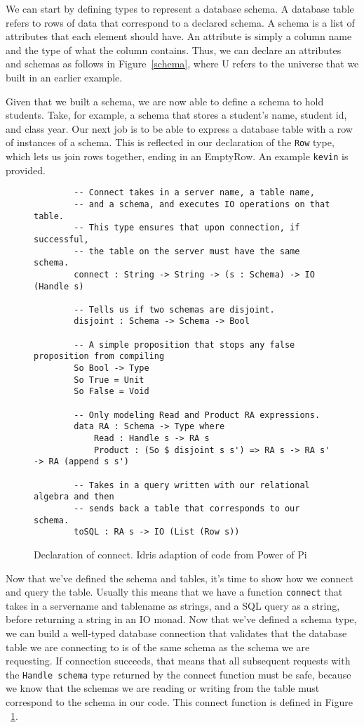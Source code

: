 We can start by defining types to represent a database schema. A database table
refers to rows of data that correspond to a declared schema. A schema is a list
of attributes that each element should have. An attribute is simply a column
name and the type of what the column contains. Thus, we can declare an
attributes and schemas as follows in Figure~\ref{schema}, where U refers to the
universe that we built in an earlier example. 

Given that we built a schema, we are now able to define a schema to hold
students. Take, for example, a schema that stores a student's name, student id,
and class year. Our next job is to be able to express a database table with a
row of instances of a schema. This is reflected in our declaration of the
\texttt{Row} type, which lets us join rows together, ending in an EmptyRow. An
example \texttt{kevin} is provided. 

\begin{figure}[ht!]
    \caption{Declaration of connect. Idris adaption of code from Power of Pi
    \protect\cite{power_of_pi}}
    \label{connect}
    \begin{lstlisting}
        -- Connect takes in a server name, a table name, 
        -- and a schema, and executes IO operations on that table. 
        -- This type ensures that upon connection, if successful, 
        -- the table on the server must have the same schema. 
        connect : String -> String -> (s : Schema) -> IO (Handle s)

        -- Tells us if two schemas are disjoint. 
        disjoint : Schema -> Schema -> Bool

        -- A simple proposition that stops any false proposition from compiling
        So Bool -> Type
        So True = Unit
        So False = Void

        -- Only modeling Read and Product RA expressions.
        data RA : Schema -> Type where
            Read : Handle s -> RA s
            Product : (So $ disjoint s s') => RA s -> RA s' -> RA (append s s')
        
        -- Takes in a query written with our relational algebra and then 
        -- sends back a table that corresponds to our schema. 
        toSQL : RA s -> IO (List (Row s))
    \end{lstlisting}
\end{figure}

Now that we've defined the schema and tables, it's time to show how we connect
and query the table. Usually this means that we have a function \texttt{connect}
that takes in a servername and tablename as strings, and a SQL query as a
string, before returning a string in an IO monad. Now that we've defined a
schema type, we can build a well-typed database connection that validates that
the database table we are connecting to is of the same schema as the schema we
are requesting. If connection succeeds, that means that all subsequent requests
with the \texttt{Handle schema} type returned by the connect function must be
safe, because we know that the schemas we are reading or writing from the table
must correspond to the schema in our code. This connect function is defined in
Figure ~\ref{connect}. 


